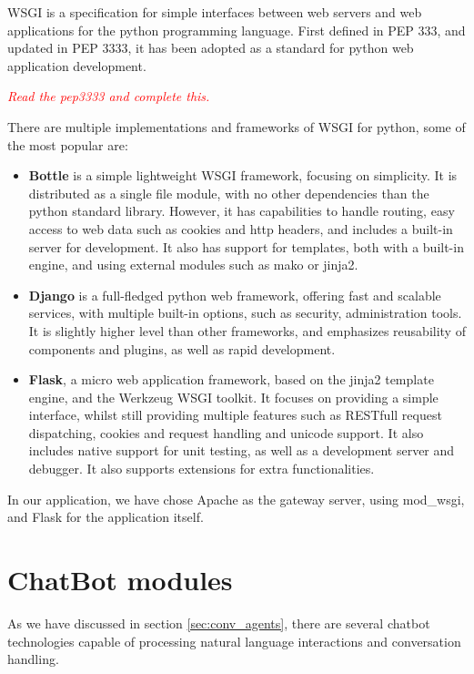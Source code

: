 \ac{WSGI} is a specification for simple interfaces between web servers and web applications for the python programming language. First defined in PEP 333\cite{pep0333}, and updated in PEP 3333\cite{pep3333}, it has been adopted as a standard for python web application development.

\emph{\textcolor{red}{Read the pep3333 and complete this.}}

There are multiple implementations and frameworks of WSGI for python, some of the most popular are:

\begin{itemize}
 \item \textbf{Bottle} is a simple lightweight WSGI framework, focusing on simplicity. It is distributed as a single file module, with no other dependencies than the python standard library. However, it has capabilities to handle routing, easy access to web data such as cookies and http headers, and includes a built-in server for development. It also has support for templates, both with a built-in engine, and using external modules such as mako or jinja2.
 \item \textbf{Django} is a full-fledged python web framework, offering fast and scalable services, with multiple built-in options, such as security, administration tools. It is slightly higher level than other frameworks, and emphasizes reusability of components and plugins, as well as rapid development. %
 \item \textbf{Flask}, a micro web application framework, based on the jinja2 template engine, and the Werkzeug WSGI toolkit. It focuses on providing a simple interface, whilst still providing multiple features such as RESTfull request dispatching, cookies and request handling and unicode support. It also includes native support for unit testing, as well as a development server and debugger. It also supports extensions for extra functionalities.
\end{itemize}

In our application, we have chose Apache as the gateway server, using mod\_wsgi, and Flask for the application itself.


\section{ChatBot modules}

As we have discussed in section \ref{sec:conv_agents}, there are several chatbot technologies capable of processing natural language interactions and conversation handling.

